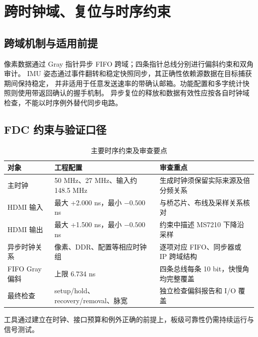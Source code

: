 \section{跨时钟域、复位与时序约束}
\subsection{跨域机制与适用前提}
像素数据通过 Gray 指针异步 FIFO 跨域；四条指针总线分别进行偏斜约束和双角审计。
IMU 姿态通过事件翻转和稳定快照同步，其正确性依赖源数据在目标捕获期间保持稳定，
并非适用于任意发送速率的带确认邮箱。功能配置和多字统计快照则使用带返回确认的握手机制。
异步复位的释放和数据有效性应按各自时钟域检查，不能以时序例外替代同步电路。

\subsection{FDC 约束与验证口径}
\begin{table}[htbp]\centering\small
\caption{主要时序约束及审查要点}
\begin{tabularx}{\textwidth}{p{3.1cm}YY}
\toprule
对象 & 工程配置 & 审查重点 \\
\midrule
主时钟 & 50 MHz、27 MHz、输入约 148.5 MHz & 生成时钟须保留实际来源及倍分频关系 \\
HDMI 输入 & 最大 +2.000 ns，最小 $-0.500$ ns & 与桥芯片、布线及采样关系核对 \\
HDMI 输出 & 最大 +1.500 ns，最小 $-0.500$ ns & 约束中描述 MS7210 下降沿采样 \\
异步时钟关系 & 像素、DDR、配置等相应时钟组 & 逐项对应 FIFO、同步器或 IP 跨域结构 \\
FIFO Gray 偏斜 & 上限 6.734 ns & 四条总线每条 10 bit，快慢角均完整覆盖 \\
最终检查 & setup/hold、recovery/removal、脉宽 & 独立检查偏斜报告和 I/O 覆盖 \\
\bottomrule
\end{tabularx}
\end{table}
工具通过建立在时钟、接口预算和例外正确的前提上，板级可靠性仍需持续运行与信号测试。
